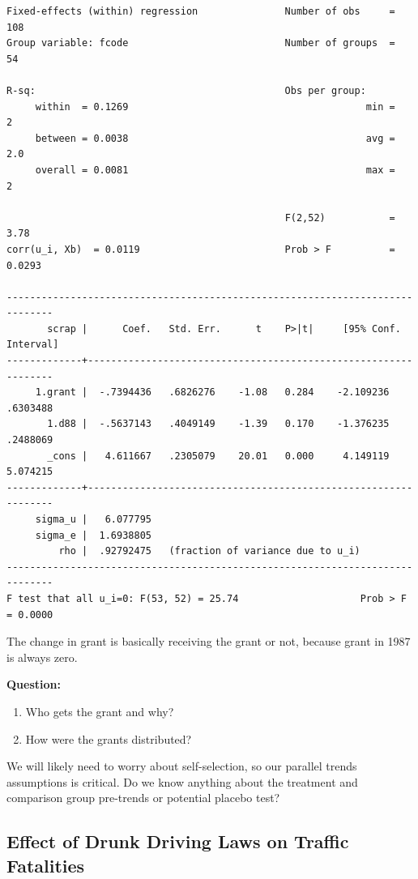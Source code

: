 \documentclass[
]{book}
\providecommand{\tightlist}{%
  \setlength{\itemsep}{0pt}\setlength{\parskip}{0pt}}
\begin{document}
\begin{verbatim}
Fixed-effects (within) regression               Number of obs     =        108
Group variable: fcode                           Number of groups  =         54

R-sq:                                           Obs per group:
     within  = 0.1269                                         min =          2
     between = 0.0038                                         avg =        2.0
     overall = 0.0081                                         max =          2

                                                F(2,52)           =       3.78
corr(u_i, Xb)  = 0.0119                         Prob > F          =     0.0293

------------------------------------------------------------------------------
       scrap |      Coef.   Std. Err.      t    P>|t|     [95% Conf. Interval]
-------------+----------------------------------------------------------------
     1.grant |  -.7394436   .6826276    -1.08   0.284    -2.109236    .6303488
       1.d88 |  -.5637143   .4049149    -1.39   0.170    -1.376235    .2488069
       _cons |   4.611667   .2305079    20.01   0.000     4.149119    5.074215
-------------+----------------------------------------------------------------
     sigma_u |   6.077795
     sigma_e |  1.6938805
         rho |  .92792475   (fraction of variance due to u_i)
------------------------------------------------------------------------------
F test that all u_i=0: F(53, 52) = 25.74                     Prob > F = 0.0000
\end{verbatim}

The change in grant is basically receiving the grant or not, because grant in 1987 is always zero.

\textbf{Question:}

\begin{enumerate}
\def\labelenumi{\arabic{enumi}.}
\tightlist
\item
  Who gets the grant and why?
\item
  How were the grants distributed?
\end{enumerate}

We will likely need to worry about self-selection, so our parallel trends assumptions is critical. Do we know anything about the treatment and comparison group pre-trends or potential placebo test?

\subsection{Effect of Drunk Driving Laws on Traffic Fatalities}\label{effect-of-drunk-driving-laws-on-traffic-fatalities}
\end{document}
